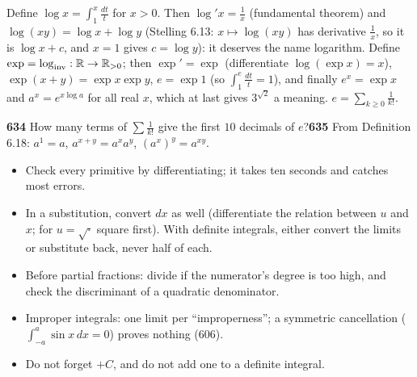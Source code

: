 \begin{key}
Define $\log x=\int_1^x\frac{dt}t$ for $x>0$. Then $\log'x=\frac1x$ (fundamental theorem) and $\log(xy)=\log x+\log y$ (Stelling 6.13: $x\mapsto\log(xy)$ has derivative $\frac1x$, so it is $\log x+c$, and $x=1$ gives $c=\log y$): it deserves the name logarithm. Define $\exp=\log_{\mathrm{inv}}:\mathbb{R}\to\mathbb{R}_{>0}$; then $\exp'=\exp$ (differentiate $\log(\exp x)=x$), $\exp(x+y)=\exp x\exp y$, $e=\exp1$ (so $\int_1^e\frac{dt}t=1$), and finally $e^x=\exp x$ and $a^x=e^{x\log a}$ for all real $x$, which at last gives $3^{\sqrt2}$ a meaning. $e=\sum_{k\ge0}\frac1{k!}$.
\end{key}

\begin{trybox}
\textbf{634} How many terms of $\sum\frac1{k!}$ give the first $10$ decimals of $e$?\quad \textbf{635} From Definition 6.18: $a^1=a$, $a^{x+y}=a^xa^y$, $(a^x)^y=a^{xy}$.
\end{trybox}

\begin{warn}
\begin{itemize}
\item Check every primitive by differentiating; it takes ten seconds and catches most errors.
\item In a substitution, convert $dx$ as well (differentiate the relation between $u$ and $x$; for $u=\sqrt{\cdot}$ square first). With definite integrals, either convert the limits or substitute back, never half of each.
\item Before partial fractions: divide if the numerator's degree is too high, and check the discriminant of a quadratic denominator.
\item Improper integrals: one limit per ``improperness''; a symmetric cancellation ($\int_{-a}^a\sin x\,dx=0$) proves nothing (606).
\item Do not forget $+C$, and do not add one to a definite integral.
\end{itemize}
\end{warn}
